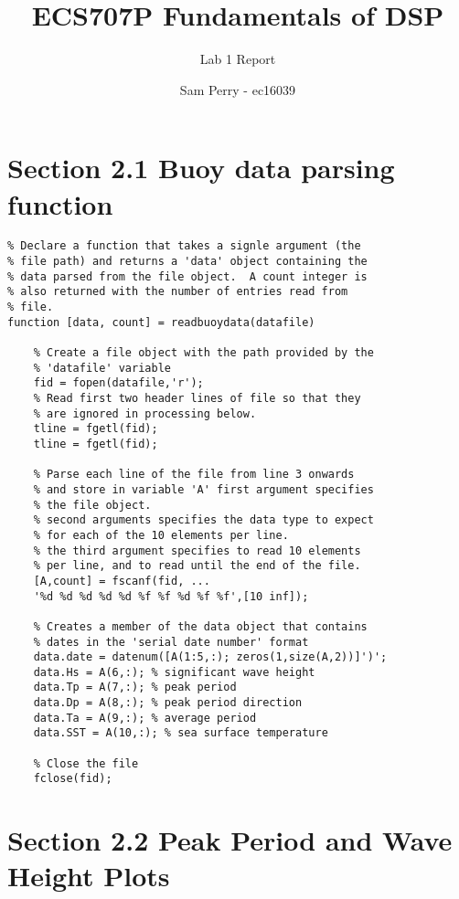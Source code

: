 \documentclass[titlepage]{scrartcl}
\begin{document}
    \title{ECS707P Fundamentals of DSP}
    \subtitle{\LARGE{Lab 1 Report}}
    \author{Sam Perry - ec16039}

    \maketitle

    \section*{Section 2.1 Buoy data parsing function}
    \begin{lstlisting}
% Declare a function that takes a signle argument (the
% file path) and returns a 'data' object containing the
% data parsed from the file object.  A count integer is
% also returned with the number of entries read from
% file.
function [data, count] = readbuoydata(datafile)

    % Create a file object with the path provided by the
    % 'datafile' variable
    fid = fopen(datafile,'r');
    % Read first two header lines of file so that they
    % are ignored in processing below.
    tline = fgetl(fid);
    tline = fgetl(fid);

    % Parse each line of the file from line 3 onwards
    % and store in variable 'A' first argument specifies
    % the file object.
    % second arguments specifies the data type to expect
    % for each of the 10 elements per line.
    % the third argument specifies to read 10 elements
    % per line, and to read until the end of the file.
    [A,count] = fscanf(fid, ...
    '%d %d %d %d %d %f %f %d %f %f',[10 inf]);

    % Creates a member of the data object that contains
    % dates in the 'serial date number' format
    data.date = datenum([A(1:5,:); zeros(1,size(A,2))]')';
    data.Hs = A(6,:); % significant wave height
    data.Tp = A(7,:); % peak period
    data.Dp = A(8,:); % peak period direction
    data.Ta = A(9,:); % average period
    data.SST = A(10,:); % sea surface temperature

    % Close the file 
    fclose(fid);
    \end{lstlisting}

    \section*{Section 2.2 Peak Period and Wave Height Plots}

    \begin{figure}[H]
    \end{figure}
\end{document}
